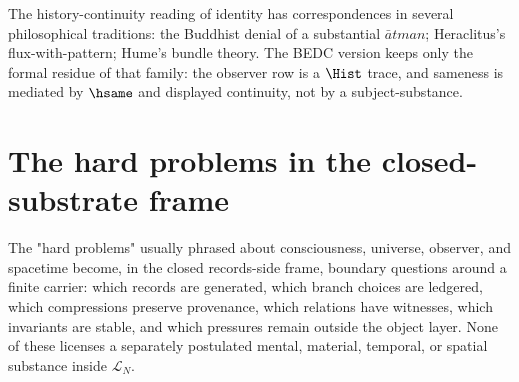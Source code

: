 \begin{remark}
\label{rem:consciousness-universe-buddhist-heraclitean}
The history-continuity reading of identity has correspondences in several philosophical traditions: the Buddhist denial of a substantial $\bar{a}tman$; Heraclitus's flux-with-pattern; Hume's bundle theory. The BEDC version keeps only the formal residue of that family: the observer row is a $\Hist$ trace, and sameness is mediated by $\hsame$ and displayed continuity, not by a subject-substance.
\end{remark}

\section{The hard problems in the closed-substrate frame}
\label{sec:consciousness-universe-hard-problems-in-frame}

\begin{principle}
\label{prin:consciousness-universe-hard-problems-as-structural}
The "hard problems" usually phrased about consciousness, universe, observer, and spacetime become, in the closed records-side frame, boundary questions around a finite carrier: which records are generated, which branch choices are ledgered, which compressions preserve provenance, which relations have witnesses, which invariants are stable, and which pressures remain outside the object layer. None of these licenses a separately postulated mental, material, temporal, or spatial substance inside $\mathcal{L}_N$.
\end{principle}

